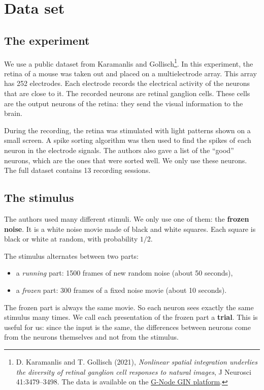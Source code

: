 \documentclass[11pt,a4paper]{article}
\begin{document}
\section{Data set}
\label{sec:data}

\subsection{The experiment}
We use a public dataset from Karamanlis and Gollisch\footnote{D. Karamanlis and T. Gollisch (2021), \textit{Nonlinear spatial integration underlies the diversity of retinal ganglion cell responses to natural images}, J Neurosci 41:3479--3498. The data is available on the \href{https://gin.g-node.org/gollischlab/Karamanlis_Gollisch_2021_RGC_spiketrains_natural_image_encoding}{G-Node GIN platform}.}. In this experiment, the retina of a mouse was taken out and placed on a multielectrode array. This array has 252 electrodes. Each electrode records the electrical activity of the neurons that are close to it. The recorded neurons are retinal ganglion cells. These cells are the output neurons of the retina: they send the visual information to the brain.

During the recording, the retina was stimulated with light patterns shown on a small screen. A spike sorting algorithm was then used to find the spikes of each neuron in the electrode signals. The authors also gave a list of the ``good'' neurons, which are the ones that were sorted well. We only use these neurons. The full dataset contains 13 recording sessions.

\subsection{The stimulus}
The authors used many different stimuli. We only use one of them: the \textbf{frozen noise}. It is a white noise movie made of black and white squares. Each square is black or white at random, with probability $1/2$.

The stimulus alternates between two parts:
\begin{itemize}
    \item a \textit{running} part: 1500 frames of new random noise (about 50 seconds),
    \item a \textit{frozen} part: 300 frames of a fixed noise movie (about 10 seconds).
\end{itemize}
The frozen part is always the same movie. So each neuron sees exactly the same stimulus many times. We call each presentation of the frozen part a \textbf{trial}. This is useful for us: since the input is the same, the differences between neurons come from the neurons themselves and not from the stimulus.
\end{document}
